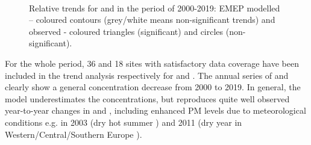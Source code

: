 \begin{figure}  %
  \\
\caption{Relative trends for \PM[10] and \PM[2.5] in the period of 2000-2019: EMEP modelled -- coloured contours (grey/white means non-significant trends) and observed - coloured triangles (significant) and circles (non-significant).}
\label{fig:PMtrends}
\end{figure}


For the whole period, 36 and 18 sites with satisfactory data coverage have been included in the trend analysis respectively for \PM[10] and \PM[2.5]. The annual series of \PM[10] and \PM[2.5] clearly show a general concentration decrease from 2000 to 2019. In general, the model underestimates the concentrations, but reproduces quite well observed year-to-year changes in \PM[10] and \PM[2.5], including enhanced PM levels due to meteorological conditions e.g. in 2003 (dry hot summer \citep{EMEP:PM2005}) and 2011 (dry year in Western/Central/Southern Europe \citep{EMEP:PM2013}).

